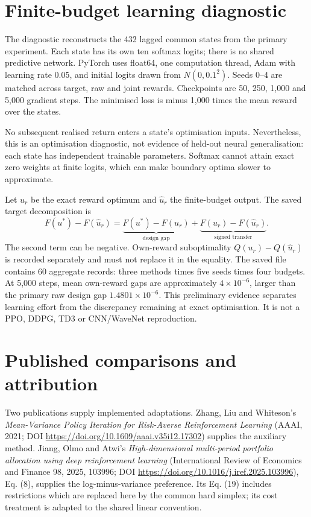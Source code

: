 \documentclass[11pt,a4paper]{article}
\begin{document}
\section{Finite-budget learning diagnostic}
The diagnostic reconstructs the 432 lagged common states from the primary experiment. Each state has its own ten softmax logits; there is no shared predictive network. PyTorch uses float64, one computation thread, Adam with learning rate 0.05, and initial logits drawn from $N(0,0.1^2)$. Seeds 0--4 are matched across target, raw and joint rewards. Checkpoints are 50, 250, 1,000 and 5,000 gradient steps. The minimised loss is minus 1,000 times the mean reward over the states.

No subsequent realised return enters a state's optimisation inputs. Nevertheless, this is an optimisation diagnostic, not evidence of held-out neural generalisation: each state has independent trainable parameters. Softmax cannot attain exact zero weights at finite logits, which can make boundary optima slower to approximate.

Let $u_r$ be the exact reward optimum and $\hat u_r$ the finite-budget output. The saved target decomposition is
\[
F(u^*)-F(\hat u_r)=\underbrace{F(u^*)-F(u_r)}_{\text{design gap}}+
\underbrace{F(u_r)-F(\hat u_r)}_{\text{signed transfer}}.
\]
The second term can be negative. Own-reward suboptimality $Q(u_r)-Q(\hat u_r)$ is recorded separately and must not replace it in the equality. The saved file contains 60 aggregate records: three methods times five seeds times four budgets. At 5,000 steps, mean own-reward gaps are approximately $4\times10^{-6}$, larger than the primary raw design gap $1.4801\times10^{-6}$. This preliminary evidence separates learning effort from the discrepancy remaining at exact optimisation. It is not a PPO, DDPG, TD3 or CNN/WaveNet reproduction.

\section{Published comparisons and attribution}
Two publications supply implemented adaptations. Zhang, Liu and Whiteson's \emph{Mean-Variance Policy Iteration for Risk-Averse Reinforcement Learning} (AAAI, 2021; DOI \url{https://doi.org/10.1609/aaai.v35i12.17302}) supplies the auxiliary method. Jiang, Olmo and Atwi's \emph{High-dimensional multi-period portfolio allocation using deep reinforcement learning} (International Review of Economics and Finance 98, 2025, 103996; DOI \url{https://doi.org/10.1016/j.iref.2025.103996}), Eq. (8), supplies the log-minus-variance preference. Its Eq. (19) includes restrictions which are replaced here by the common hard simplex; its cost treatment is adapted to the shared linear convention.
\end{document}
